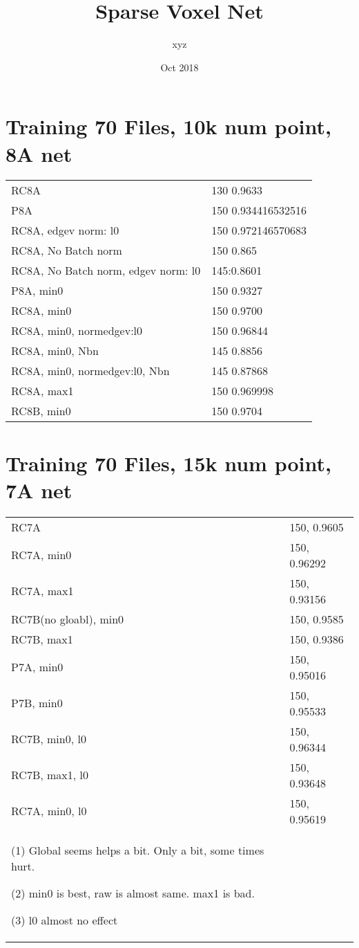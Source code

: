 \documentclass[,table,dvipsnames]{article}
\title{Sparse Voxel Net}
\author{xyz}
\date{Oct 2018}
\begin{document}
	
\noindent
\begin{titlepage}
	\maketitle
\end{titlepage}	

\section{Training 70 Files, 10k num point, 8A net}
\noindent\begin{tabular}{|p{10cm}|p{5.5cm}| }	
\hline \hline
\rowcolor{green!20}
RC8A  & 130 0.9633 \\
P8A & 150 0.934416532516 \\
RC8A,  edgev norm: l0 & 150 0.972146570683 \\
RC8A, No Batch norm  & 150 0.865 \\
RC8A, No Batch norm,  edgev norm: l0  & 145:0.8601 \\
 \hline 	
P8A, min0  & 150 0.9327 \\
RC8A, min0  & 150 0.9700 \\
RC8A, min0, normedgev:l0  & 150 0.96844 \\
RC8A, min0, Nbn & 145 0.8856 \\
RC8A, min0, normedgev:l0, Nbn  & 145 0.87868 \\
 \hline
RC8A, max1  & 150 0.969998 \\
 \hline 
RC8B, min0  & 150 0.9704 \\
 \hline 
\end{tabular}

\section{Training 70 Files, 15k num point, 7A net}
\noindent\begin{tabular}{|p{10cm}|p{5.5cm}| }	
	\hline 
	\rowcolor{green!20}
	RC7A  & 150, 0.9605 \\
	RC7A, min0 & 150, 0.96292 \\
	RC7A, max1 & 150, 0.93156 \\
	RC7B(no gloabl), min0 & 	150, 0.9585 \\
	RC7B, max1 & 	150, 0.9386 \\
	\hline
	P7A, min0 & 150, 0.95016\\
	P7B, min0 & 150, 0.95533\\
	\hline 
	RC7B, min0, l0 & 	150, 0.96344 \\
	RC7B, max1, l0 & 	150, 0.93648 \\
	RC7A, min0, l0 & 150, 0.95619 \\
	\hline 
	(1) Global seems helps a bit. Only a bit, some times hurt.  \par 
	(2) min0 is best, raw is almost same. max1 is bad. \par 
	(3) l0 almost no effect  & \\
	\hline
\end{tabular}
 
\end{document}
